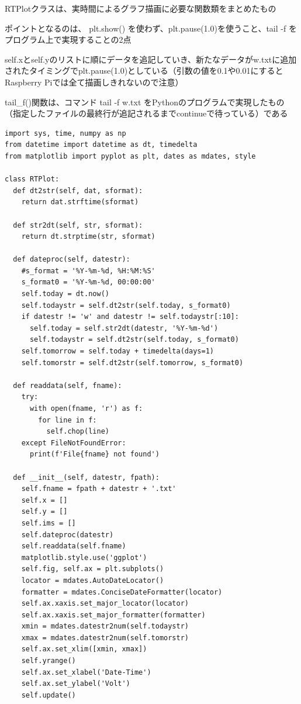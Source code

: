 \documentclass[12pt,a4j]{jsbook}
\begin{document}
	RTPlotクラスは、実時間によるグラフ描画に必要な関数類をまとめたもの

	ポイントとなるのは、 plt.show() を使わず、plt.pause(1.0)を使うこと、tail -f をプログラム上で実現することの2点

	self.xとself.yのリストに順にデータを追記していき、新たなデータがw.txtに追加されたタイミングでplt.pause(1.0)としている（引数の値を0.1や0.01にするとRaspberry Piでは全て描画しきれないので注意）

	tail\_f()関数は、コマンド tail -f w.txt をPythonのプログラムで実現したもの（指定したファイルの最終行が追記されるまでcontinueで待っている）である

\begin{spacing}{0.87}
\begin{breakbox}%
\begin{verbatim}
import sys, time, numpy as np
from datetime import datetime as dt, timedelta
from matplotlib import pyplot as plt, dates as mdates, style

class RTPlot:
  def dt2str(self, dat, sformat):
    return dat.strftime(sformat)

  def str2dt(self, str, sformat):
    return dt.strptime(str, sformat)

  def dateproc(self, datestr):
    #s_format = '%Y-%m-%d, %H:%M:%S'
    s_format0 = '%Y-%m-%d, 00:00:00'
    self.today = dt.now()
    self.todaystr = self.dt2str(self.today, s_format0)
    if datestr != 'w' and datestr != self.todaystr[:10]:
      self.today = self.str2dt(datestr, '%Y-%m-%d')
      self.todaystr = self.dt2str(self.today, s_format0)
    self.tomorrow = self.today + timedelta(days=1)
    self.tomorstr = self.dt2str(self.tomorrow, s_format0)

  def readdata(self, fname):
    try:
      with open(fname, 'r') as f:
        for line in f:
          self.chop(line)
    except FileNotFoundError:
      print(f'File{fname} not found')

  def __init__(self, datestr, fpath):
    self.fname = fpath + datestr + '.txt'
    self.x = []
    self.y = []
    self.ims = []
    self.dateproc(datestr)
    self.readdata(self.fname)
    matplotlib.style.use('ggplot')
    self.fig, self.ax = plt.subplots()
    locator = mdates.AutoDateLocator()
    formatter = mdates.ConciseDateFormatter(locator)
    self.ax.xaxis.set_major_locator(locator)
    self.ax.xaxis.set_major_formatter(formatter)
    xmin = mdates.datestr2num(self.todaystr)
    xmax = mdates.datestr2num(self.tomorstr)
    self.ax.set_xlim([xmin, xmax])
    self.yrange()
    self.ax.set_xlabel('Date-Time')
    self.ax.set_ylabel('Volt')
    self.update()


\end{verbatim}
\end{breakbox}
\end{spacing}
\end{document}
